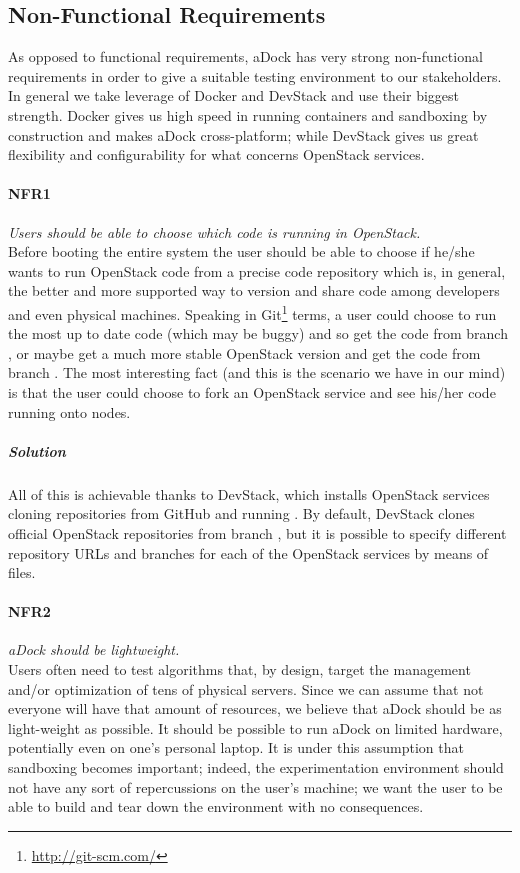 \subsection{Non-Functional Requirements}
\label{sub:nonfunc_req}
As opposed to functional requirements, aDock has very strong non-functional requirements in order to give a suitable testing environment to our stakeholders. In general we take leverage of Docker and DevStack and use their biggest strength. Docker gives us high speed in running containers and sandboxing by construction and makes aDock cross-platform; while DevStack gives us great flexibility and configurability for what concerns OpenStack services.

\paragraph{NFR1}\label{p:nfr1} \emph{Users should be able to choose which code is running in OpenStack.} \hfill \\
Before booting the entire system the user should be able to choose if he/she wants to run OpenStack code from a precise code repository which is, in general, the better and more supported way to version and share code among developers and even physical machines. Speaking in Git\footnote{\url{http://git-scm.com/}} terms, a user could choose to run the most up to date code (which may be buggy) and so get the code from branch , or maybe get a much more stable OpenStack version and get the code from branch . The most interesting fact (and this is the scenario we have in our mind) is that the user could choose to fork an OpenStack service and see his/her code running onto nodes.

\subparagraph{Solution} All of this is achievable thanks to DevStack, which installs OpenStack services cloning repositories from GitHub and running . By default, DevStack clones official OpenStack repositories from branch , but it is possible to specify different repository URLs and branches for each of the OpenStack services by means of  files.

\paragraph{NFR2}\label{p:nfr2} \emph{aDock should be lightweight.} \hfill \\
Users often need to test algorithms that, by design, target the management and/or optimization of tens of physical servers. Since we can assume that not everyone will have that amount of resources, we believe that aDock should be as light-weight as possible. It should be possible to run aDock on limited hardware, potentially even on one's personal laptop. It is under this assumption that sandboxing becomes important; indeed, the experimentation environment should not have any sort of repercussions on the user's machine; we want the user to be able to build and tear down the environment with no consequences.

